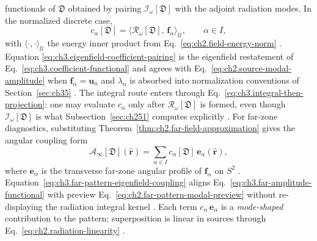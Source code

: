 functionals of \(\mathfrak{D}\) obtained by pairing \(\mathcal{I}_\omega[\mathfrak{D}]\) with the
adjoint radiation modes. In the normalized discrete case,
\begin{equation}
\label{eq:ch3.eigenfield-coefficient-pairing}
c_\alpha[\mathfrak{D}]
=
\big\langle \mathcal{R}_\omega[\mathfrak{D}],\,\mathbf{f}_\alpha\big\rangle_{\mathcal{U}},
\qquad
\alpha\in I,
\end{equation}
with \(\langle\cdot,\cdot\rangle_{\mathcal{U}}\) the energy inner product from
Eq.~\eqref{eq:ch2.field-energy-norm} \cite{stratton1941}. Equation
\eqref{eq:ch3.eigenfield-coefficient-pairing} is the eigenfield restatement of
Eq.~\eqref{eq:ch3.coefficient-functional} and agrees with
Eq.~\eqref{eq:ch2.source-modal-amplitude} when \(\mathbf{f}_\alpha=\mathbf{u}_n\) and
\(\lambda_n\) is absorbed into normalization conventions of Section~\ref{sec:ch35}
\cite{stratton1941}. The integral route enters through
Eq.~\eqref{eq:ch3.integral-then-projection}: one may evaluate \(c_\alpha\) only after
\(\mathcal{R}_\omega[\mathfrak{D}]\) is formed, even though \(\mathcal{I}_\omega[\mathfrak{D}]\)
is what Subsection~\ref{sec:ch251} computes explicitly \cite{harrington2001}.
For far-zone diagnostics, substituting Theorem~\ref{thm:ch2.far-field-approximation} gives the
angular coupling form
\begin{equation}
\label{eq:ch3.far-pattern-eigenfield-coupling}
\mathcal{A}_\infty[\mathfrak{D}](\hat{\mathbf{r}})
=
\sum_{\alpha\in I}
c_\alpha[\mathfrak{D}]\,\mathbf{e}_\alpha(\hat{\mathbf{r}}),
\end{equation}
where \(\mathbf{e}_\alpha\) is the transverse far-zone angular profile of \(\mathbf{f}_\alpha\)
on \(S^{2}\) \cite{stratton1941}. Equation~\eqref{eq:ch3.far-pattern-eigenfield-coupling}
aligns Eq.~\eqref{eq:ch3.far-amplitude-functional} with preview
Eq.~\eqref{eq:ch2.far-pattern-modal-preview} without re-displaying the radiation integral kernel
\cite{harrington2001}. Each term \(c_\alpha\,\mathbf{e}_\alpha\) is a \emph{mode-shaped} contribution
to the pattern; superposition is linear in sources through
Eq.~\eqref{eq:ch2.radiation-linearity} \cite{stratton1941}.
